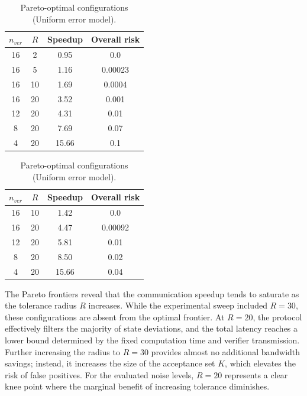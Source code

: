 \begin{table}[!htbp]
    \centering
    \small
    \setlength{\tabcolsep}{8pt}
    \begin{minipage}[t]{0.48\textwidth}
        \centering
        \caption{Pareto-optimal configurations (Gaussian error model).}
        \label{tab:pareto_gaussian}
        \begin{tabular}{cccc}
            \toprule
            $n_{ver}$ & $R$ & Speedup & Overall risk \\
            \midrule
            16  & 2  & 0.95 & 0.0 \\
            16  & 5  & 1.16 & 0.00023 \\
            16  & 10 & 1.69 & 0.0004 \\
            16  & 20 & 3.52 & 0.001 \\
            12  & 20 & 4.31 & 0.01 \\
            8   & 20 & 7.69 & 0.07 \\
            4   & 20 & 15.66 & 0.1 \\
            \bottomrule
        \end{tabular}
    \end{minipage}
    \hfill
    \begin{minipage}[t]{0.48\textwidth}
        \centering
        \caption{Pareto-optimal configurations (Uniform error model).}
        \label{tab:pareto_uniform}
        \begin{tabular}{cccc}
            \toprule
            $n_{ver}$ & $R$ & Speedup & Overall risk \\
            \midrule
            16  & 10 & 1.42 & 0.0 \\
            16  & 20 & 4.47 & 0.00092 \\
            12  & 20 & 5.81 & 0.01 \\
            8   & 20 & 8.50 & 0.02 \\
            4   & 20 & 15.66 & 0.04 \\
            \bottomrule
        \end{tabular}
    \end{minipage}
\end{table}

\FloatBarrier

The Pareto frontiers reveal that the communication speedup tends to saturate as the tolerance radius $R$ increases. While the experimental sweep included $R = 30$, these configurations are absent from the optimal frontier. At $R = 20$, the protocol effectively filters the majority of state deviations, and the total latency reaches a lower bound determined by the fixed computation time and verifier transmission. Further increasing the radius to $R = 30$ provides almost no additional bandwidth savings; instead, it increases the size of the acceptance set $K$, which elevates the risk of false positives. For the evaluated noise levels, $R = 20$ represents a clear knee point where the marginal benefit of increasing tolerance diminishes.

